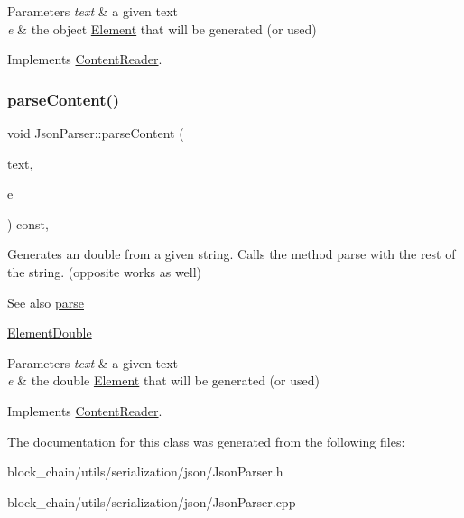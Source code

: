 \begin{DoxyParams}{Parameters}
{\em text} & a given text \\
\hline
{\em e} & the object \mbox{\hyperlink{classElement}{Element}} that will be generated (or used) \\
\hline
\end{DoxyParams}


Implements \mbox{\hyperlink{classContentReader_a59a8de2bf3436e46b4d029a9b3c3c9da}{Content\+Reader}}.

\mbox{\label{classJsonParser_a07a4f2b10547d5f2251bc1f7b09d02c1}} 
\subsubsection{\texorpdfstring{parse\+Content()}{parseContent()}\hspace{0.1cm}{\footnotesize\ttfamily [6/6]}}
{\footnotesize\ttfamily void Json\+Parser\+::parse\+Content (\begin{DoxyParamCaption}\item[{std\+::string \&}]{text,  }\item[{\mbox{\hyperlink{classElementDouble}{Element\+Double}} $\ast$}]{e }\end{DoxyParamCaption}) const\hspace{0.3cm}{\ttfamily [override]}, {\ttfamily [virtual]}}

Generates an double from a given string. Calls the method parse with the rest of the string. (opposite works as well) \begin{DoxySeeAlso}{See also}
\mbox{\hyperlink{classJsonParser_a3ec3a9fcc8a63f987b4749d60b0568df}{parse}} 

\mbox{\hyperlink{classElementDouble}{Element\+Double}}
\end{DoxySeeAlso}

\begin{DoxyParams}{Parameters}
{\em text} & a given text \\
\hline
{\em e} & the double \mbox{\hyperlink{classElement}{Element}} that will be generated (or used) \\
\hline
\end{DoxyParams}


Implements \mbox{\hyperlink{classContentReader_ab4ba739ee5241848ae8af86e64e43a40}{Content\+Reader}}.



The documentation for this class was generated from the following files\+:\begin{DoxyCompactItemize}
\item 
block\+\_\+chain/utils/serialization/json/Json\+Parser.\+h\item 
block\+\_\+chain/utils/serialization/json/Json\+Parser.\+cpp\end{DoxyCompactItemize}
